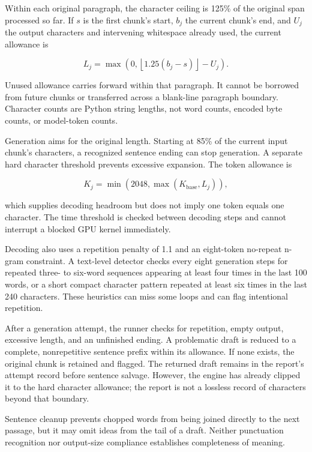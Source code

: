 \documentclass[manuscript,screen,nonacm]{acmart}
\begin{document}
Within each original paragraph, the character ceiling is 125\% of the
original span processed so far. If \(s\) is the first chunk's start,
\(b_j\) the current chunk's end, and \(U_j\) the output characters and
intervening whitespace already used, the current allowance is

\[
L_j=\max\left(0,\left\lfloor1.25(b_j-s)\right\rfloor-U_j\right).
\]

Unused allowance carries forward within that paragraph. It cannot be
borrowed from future chunks or transferred across a blank-line paragraph
boundary. Character counts are Python string lengths, not word counts,
encoded byte counts, or model-token counts.

Generation aims for the original length. Starting at 85\% of the current
input chunk's characters, a recognized sentence ending can stop
generation. A separate hard character threshold prevents excessive
expansion. The token allowance is

\[
K_j=\min\left(2048,\max(K_{\mathrm{base}},L_j)\right),
\]

which supplies decoding headroom but does not imply one token equals one
character. The time threshold is checked between decoding steps and
cannot interrupt a blocked GPU kernel immediately.

Decoding also uses a repetition penalty of 1.1 and an eight-token
no-repeat n-gram constraint. A text-level detector checks every eight
generation steps for repeated three- to six-word sequences appearing at
least four times in the last 100 words, or a short compact character
pattern repeated at least six times in the last 240 characters. These
heuristics can miss some loops and can flag intentional repetition.

After a generation attempt, the runner checks for repetition, empty
output, excessive length, and an unfinished ending. A problematic draft
is reduced to a complete, nonrepetitive sentence prefix within its
allowance. If none exists, the original chunk is retained and flagged.
The returned draft remains in the report's attempt record before
sentence salvage. However, the engine has already clipped it to the hard
character allowance; the report is not a lossless record of characters
beyond that boundary.

Sentence cleanup prevents chopped words from being joined directly to
the next passage, but it may omit ideas from the tail of a draft.
Neither punctuation recognition nor output-size compliance establishes
completeness of meaning.
\end{document}
